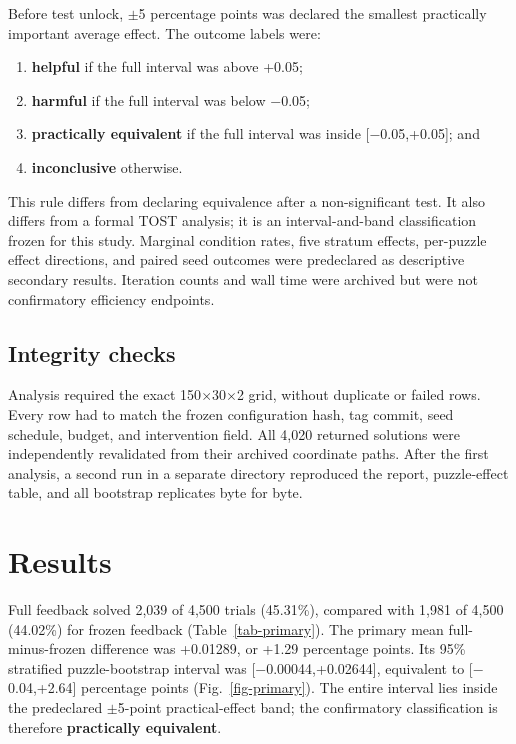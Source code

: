 \documentclass[pdflatex,sn-basic,iicol]{sn-jnl}
\begin{document}
Before test unlock, \(\pm\)5 percentage points was declared the smallest practically important average effect. The outcome labels were:

\begin{enumerate}
\item \textbf{helpful} if the full interval was above +0.05;
\item \textbf{harmful} if the full interval was below \(-\)0.05;
\item \textbf{practically equivalent} if the full interval was inside [\(-\)0.05,+0.05]; and
\item \textbf{inconclusive} otherwise.
\end{enumerate}

This rule differs from declaring equivalence after a non-significant test. It also differs from a formal TOST analysis; it is an interval-and-band classification frozen for this study. Marginal condition rates, five stratum effects, per-puzzle effect directions, and paired seed outcomes were predeclared as descriptive secondary results. Iteration counts and wall time were archived but were not confirmatory efficiency endpoints.

\subsection{Integrity checks}

Analysis required the exact 150\(\times\)30\(\times\)2 grid, without duplicate or failed rows. Every row had to match the frozen configuration hash, tag commit, seed schedule, budget, and intervention field. All 4,020 returned solutions were independently revalidated from their archived coordinate paths. After the first analysis, a second run in a separate directory reproduced the report, puzzle-effect table, and all bootstrap replicates byte for byte.

\section{Results}

Full feedback solved 2,039 of 4,500 trials (45.31\%), compared with 1,981 of 4,500 (44.02\%) for frozen feedback (Table~\ref{tab-primary}). The primary mean full-minus-frozen difference was +0.01289, or +1.29 percentage points. Its 95\% stratified puzzle-bootstrap interval was [\(-\)0.00044,+0.02644], equivalent to [\(-\)0.04,+2.64] percentage points (Fig.~\ref{fig-primary}). The entire interval lies inside the predeclared \(\pm\)5-point practical-effect band; the confirmatory classification is therefore \textbf{practically equivalent}.
\end{document}
